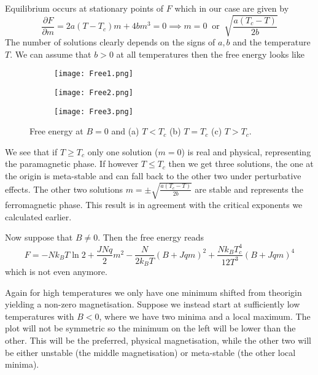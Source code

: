 \documentclass[a4paper,11pt,oneside]{book}
\begin{document}
Equilibrium occurs at stationary points of $F$ which in our case are given by
\begin{equation}
    \frac{\partial F}{\partial m} = 2a(T-T_c)m + 4bm^3 = 0 \implies m = 0 \ \text{ or } \  \sqrt{\frac{a(T_c-T)}{2b}}
\end{equation}
The number of solutions clearly depends on the signs of $a,b$ and the temperature $T$. We can assume that $b>0$ at all temperatures then the free energy looks like 
\begin{figure}[h!]
\centering
\begin{subfigure}{0.3\textwidth}
  \centering
  \texttt{[image: Free1.png]}
  \caption{}
  \label{fig:sub1}
\end{subfigure}%
\begin{subfigure}{0.3\textwidth}
  \centering
  \texttt{[image: Free2.png]}
  \caption{}
  \label{fig:sub2}
\end{subfigure}
\begin{subfigure}{0.3\textwidth}
  \centering
  \texttt{[image: Free3.png]}
  \caption{}
  \label{fig:sub2}
\end{subfigure}
\caption{Free energy at $B=0$ and (a) $T<T_c$ (b) $T=T_c$ (c) $T>T_c$.}
\label{fig:test}
\end{figure}

We see that if $T\geq T_c$ only one solution ($m=0$) is real and physical, representing the paramagnetic phase. If however $T\leq T_c$ then we get three solutions, the one at the origin is meta-stable and can fall back to the other two under perturbative effects. The other two solutions $m = \pm \sqrt{\frac{a(T_c-T)}{2b}}$ are stable and represents the ferromagnetic phase. This result is in agreement with the critical exponents we calculated earlier.

Now suppose that $B \neq 0$. Then the free energy reads
\begin{equation}
    F = -Nk_B T \ln 2 + \frac{JNq}{2}m^2- \frac{N}{2k_BT}(B+Jqm)^2 + \frac{Nk_BT_c^4}{12T^3}(B+Jqm)^4
\end{equation}
which is not even anymore. 

Again for high temperatures we only have one minimum shifted from theorigin yielding a non-zero magnetisation. Suppose we instead start at sufficiently low temperatures with $B<0$, where we have two minima and a local maximum. The plot will not be symmetric so the minimum on the left will be lower than the other. This will be the preferred, physical magnetisation, while the other two will be either unstable (the middle magnetisation) or meta-stable (the other local minima). 
\end{document}
